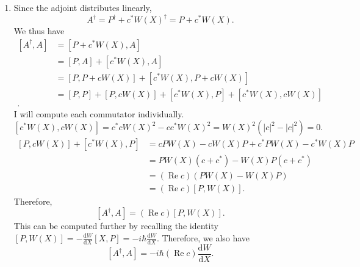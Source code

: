 \documentclass[11pt, letterpaper]{article}
\begin{document}
\begin{enumerate}
		To show that $P$ is a Hermitian operator, recall that every state $\ket{\psi _1} ,\ket{\psi _2} $ can be viewed in position space as a wavefunction $\psi _1(x),\psi _2(x)$. By definition of an adjoint,
		\begin{align*}
			\bra{\psi _1} P\ket{\psi _2} &=-i \hbar \int_{-\infty }^{\infty } \psi _1^*(x) \frac{\mathrm{d}}{\mathrm{d}x} \psi _2(x) \,\mathrm{d} x\\
						     &=-i \hbar \left( \left[ \psi _1^*(x)\psi _2(x) \right]_{-\infty }^{\infty } -\int_{-\infty }^{\infty } \left( \frac{\mathrm{d}}{\mathrm{d}x} \psi _1^*(x) \right) \psi _2(x) \,\mathrm{d} x \right) \\
						     &=-i\hbar \left[ \psi _1^*(x)\psi _2(x) \right]_{-\infty } ^{\infty } +\int_{-\infty }^{\infty } i\hbar \left(\frac{\mathrm{d}}{\mathrm{d}x} \psi _1^*(x)\right)\psi _2(x) \,\mathrm{d} x\\
						     &=-i\hbar \left[ \psi_1^*(x)\psi _2(x) \right]_{-\infty } ^{\infty } +\int_{-\infty }^{\infty } \left( P^{\dagger} \psi _1(x) \right)^*\psi _2(x) \,\mathrm{d} x
		.\end{align*}
		Assume the boundary terms vanish at infinity for physically valid wavefunctions. For this equality to hold, we must have that $P^{\dagger} =-i\hbar \frac{\mathrm{d}}{\mathrm{d}x} =P$.
	\item Since the adjoint distributes linearly,
		\[
			A^{\dagger} =P^{\dagger} +c^*W(X)^{\dagger} =P+c^*W(X)
		.\]
		We thus have
		\begin{align*}
			\left[ A^{\dagger} ,A \right] &=\left[ P+c^*W(X),A \right] \\
						      &=\left[ P,A \right] +\left[ c^*W(X),A \right] \\
						      &=\left[ P,P+cW(X) \right] +\left[ c^*W(X),P+cW(X) \right] \\
						      &=\left[ P,P \right] +\left[ P,cW(X) \right] +\left[ c^*W(X),P \right] +\left[ c^*W(X),cW(X) \right] \\
		.\end{align*}
		I will compute each commutator individually.
		\[
			\left[ c^*W(X),cW(X) \right] =c^*cW(X)^2-cc^*W(X)^2=W\left( X \right)^2\left( \left| c \right| ^2-\left| c \right| ^2 \right) =0
		.\]
		\begin{align*}
			\left[ P,cW(X) \right] +\left[ c^*W(X),P \right] &=cPW(X)-cW(X)P+c^*PW(X)-c^*W(X)P\\
									 &=PW(X)\left( c+c^* \right) -W(X)P\left( c+c^* \right) \\
									 &=(\operatorname{Re}c)\left( PW(X)-W(X)P \right) \\
									 &=(\operatorname{Re}c)\left[ P,W(X) \right] 
		.\end{align*}
		Therefore,
		\[
			\left[ A^{\dagger} ,A \right] =(\operatorname{Re} c)\left[ P,W(X) \right] 
		.\]
		This can be computed further by recalling the identity $\left[ P,W(X) \right] =-\frac{\mathrm{d}W}{\mathrm{d}X} \left[ X,P \right] =-i\hbar \frac{\mathrm{d}W}{\mathrm{d}X} $. Therefore, we also have
		\[
			\left[ A^{\dagger} ,A \right] =-i\hbar (\operatorname{Re} c)\frac{\mathrm{d}W}{\mathrm{d}X} 
		.\]
\end{enumerate}
\end{document}
